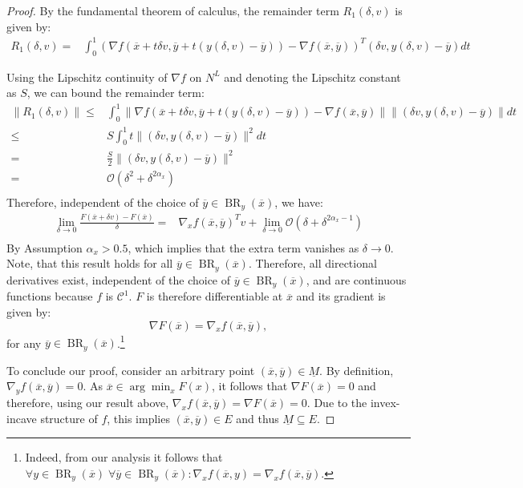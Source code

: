 \documentclass{article}
\newcommand{\cC}{\mathcal{C}}
\DeclareMathOperator{\BR}{BR}
\begin{document}
\begin{proof}
    By the fundamental theorem of calculus, the remainder term $R_1(\delta,v)$ is given by:
    \begin{align*}
        R_1(\delta,v) =& \int_0^1  \left(\nabla f(\overline{x}+t \delta v,\overline{y}+t(y(\delta,v)-\overline{y}))-\nabla f(\overline{x},\overline{y})\right)^T \left( \delta v, y(\delta,v)-\overline{y}\right) dt 
    \end{align*}

    Using the Lipschitz continuity of $\nabla f$ on $N^L$ and denoting the Lipschitz constant as $S$, we can bound the remainder term:
    \begin{align*}
        \|R_1(\delta,v)\| \leq & \int_0^1 \|\nabla f(\overline{x}+t \delta v,\overline{y}+t(y(\delta,v)-\overline{y}))-\nabla f(\overline{x},\overline{y})\|  \| \left( \delta v, y(\delta,v)-\overline{y}\right) \| dt \\
        \leq & S \int_0^1 t \|\left( \delta v, y(\delta,v)-\overline{y}\right) \|^2 dt \\
        = & \frac{S}{2} \|\left( \delta v, y(\delta,v)-\overline{y}\right) \|^2 \\
        = & \mathcal{O}(\delta^2 + \delta^{2\alpha_x} )\\
    \end{align*}
    Therefore, independent of the choice of $\overline{y}\in \BR_y(\overline{x})$, we have:
    \begin{align*}
        \lim_{\delta \to 0} \frac{F(\overline{x}+\delta v)-F(\overline{x})}{\delta} =& \nabla_x f(\overline{x},\overline{y})^T v + \lim_{\delta \to 0} \mathcal{O}(\delta+\delta^{2\alpha_x-1})\\
    \end{align*}    
    By Assumption $\alpha_x>0.5$, which implies that the extra term vanishes as $\delta \to 0$. Note, that this result holds for all $\overline{y}\in \BR_y(\overline{x})$. Therefore, all directional derivatives exist, independent of the choice of $\overline{y}\in \BR_y(\overline{x})$, and are continuous functions because $f$ is $\cC^1$. $F$ is therefore differentiable at $\overline{x}$ and its gradient is given by:
    \[
    \nabla F(\overline{x}) = \nabla_x f(\overline{x},\overline{y}),
    \]
    for any $\overline{y} \in \BR_y(\overline{x})$.\footnote{Indeed, from our analysis it follows that $\forall y \in \BR_y(\overline{x})\; \forall \overline{y} \in \BR_y(\overline{x}):\nabla_x f(\overline{x},y)=\nabla_x f(\overline{x},\overline{y})$.} 

    To conclude our proof, consider an arbitrary point $(\overline{x},\overline{y})\in \underline{M}$. By definition, $\nabla_y f(\overline{x},\overline{y})=0$. As $\overline{x}\in \arg\min_x F(x)$, it follows that $\nabla F(\overline{x})=0$ and therefore, using our result above, $\nabla_x f(\overline{x},\overline{y})=\nabla F(\overline{x})=0$. Due to the invex-incave structure of $f$, this implies $(\overline{x},\overline{y})\in E$ and thus $\underline{M}\subseteq E$.
\end{proof}
\end{document}
